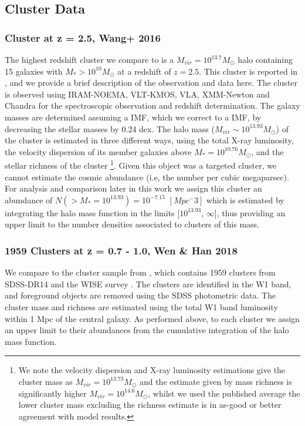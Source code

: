 \subsection{Cluster Data}
\label{subsec:Clusters}
\subsubsection{Cluster at z = 2.5, Wang+ 2016}
\label{subsubsec:Wang}
The highest redshift cluster we compare to is a $M_{vir} = 10^{13.7} M_{\odot}$ halo containing 15 galaxies with $M_* > 10^{10} M_{\odot}$ at a redshift of $z = 2.5$.
This cluster is reported in \citet{Wang2016DISCOVERY2.506}, and we provide a brief description of the observation and data here.
The cluster is observed using IRAM-NOEMA, VLT-KMOS, VLA, XMM-Newton and Chandra for the spectroscopic observation and redshift determination.  
The galaxy masses are determined assuming a \citet{Salpeter1955TheEvolution.} IMF, which we correct to a \citet{Chabrier2003GalacticFunction} IMF, by decreasing the stellar masses by 0.24 dex.
The halo mass ($M_{vir} \sim 10^{13.93} M_{\odot}$) of the cluster is estimated in three different ways, using the total X-ray luminosity, the velocity dispersion of its member galaxies above $M_* = 10^{10.76} M_{\odot}$, and the stellar richness of the cluster \footnote{We note the velocity dispersion and X-ray luminosity estimations give the cluster mass as $M_{vir} = 10^{13.73} M_{\odot}$ and the estimate given by mass richness is significantly higher $M_{vir} = 10^{14.6} M_{\odot}$, whilst we used the published average the lower cluster mass excluding the richness estimate is in as-good or better agreement with model results.}. Given this object was a targeted cluster, we cannot estimate the cosmic abundance (i.e, the number per cubic megaparsec). For analysis and comparison later in this work we assign this cluster an abundance of $N(> M_*=10^{13.93})=10^{-7.15}$ $[Mpc^-3]$ which is estimated by integrating the halo mass function in the limits [$10^{13.93}$, $\infty$], thus providing an upper limit to the number densities associated to clusters of this mass. 

\subsubsection{1959 Clusters at z = 0.7 - 1.0, Wen \& Han 2018}
\label{subsubsec:1959}
We compare to the cluster sample from \citet{Wen2018ARedshifts}, which contains 1959 clusters from SDSS-DR14 \citep{Abolfathi2017TheExperiment} and the WISE survey \citep{Wright2010THEPERFORMANCE}. The clusters are identified in the W1 band, and foreground objects are removed using the SDSS photometric data. The cluster mass and richness are estimated using the total W1 band luminosity within 1 Mpc of the central galaxy. As performed above, to each cluster we assign an upper limit to their abundances from the cumulative integration of the halo mass function.

